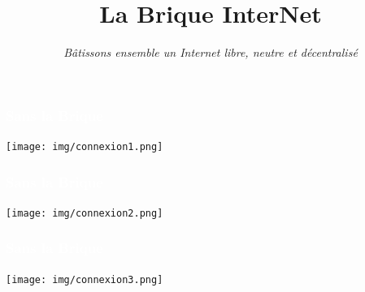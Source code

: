 \documentclass[notes=hide]{beamer}
\title{\Huge La Brique InterNet}
\subtitle{\vspace{.2cm}\emph{Bâtissons ensemble un Internet libre, neutre et décentralisé}}
\institute{\textbf{FhAP 2016}}
\begin{document}
\begin{frame}[t,plain]
\titlepage
\end{frame}

\watermarkoff
{}
\begin{frame}[t,plain]
  \begin{center}
    \vspace{\fill}
    \vspace{\fill}
  \end{center}
\end{frame}

\begin{frame}[t,plain]
  \begin{center}
    \vspace{\fill}
    \vspace{\fill}
  \end{center}
\end{frame}

\begin{frame}[t,plain]
  \begin{center}
    \vspace{\fill}
    \vspace{\fill}
  \end{center}
\end{frame}

\begin{frame}[t]
\frametitle{\textcolor{white}{Sans la Brique}}
  \color{red!60} %
  \begin{center}
    \texttt{[image: img/connexion1.png]}
  \end{center}
\end{frame}

\begin{frame}[t]
\frametitle{\textcolor{white}{Sans la Brique}}
  \begin{center}
    \texttt{[image: img/connexion2.png]}
  \end{center}
\end{frame}

\begin{frame}[t]
\frametitle{\textcolor{white}{Sans la Brique}}
  \begin{center}
    \texttt{[image: img/connexion3.png]}
  \end{center}
\end{frame}
\end{document}
